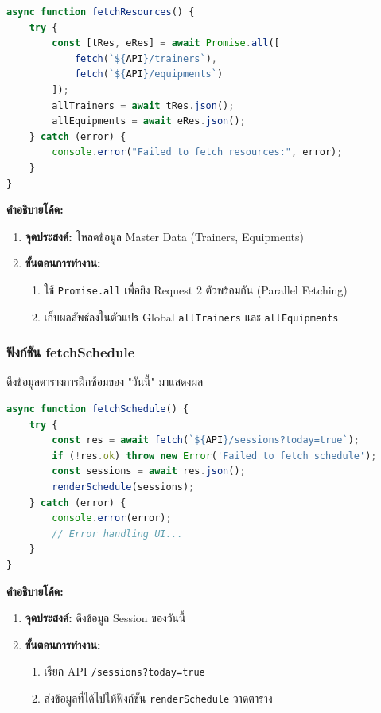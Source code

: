 \begin{lstlisting}[language=JavaScript, caption={ซอร์สโค้ดจากไฟล์ frontend/js/user/dashboard.js: ฟังก์ชัน fetchResources}, label={code:user-dash-fetch-resources}]
async function fetchResources() {
    try {
        const [tRes, eRes] = await Promise.all([
            fetch(`${API}/trainers`),
            fetch(`${API}/equipments`)
        ]);
        allTrainers = await tRes.json();
        allEquipments = await eRes.json();
    } catch (error) {
        console.error("Failed to fetch resources:", error);
    }
}
\end{lstlisting}

\textbf{คำอธิบายโค้ด:}
\begin{enumerate}
    \item \textbf{จุดประสงค์:} โหลดข้อมูล Master Data (Trainers, Equipments)
    \item \textbf{ขั้นตอนการทำงาน:}
    \begin{enumerate}
        \item ใช้ \texttt{Promise.all} เพื่อยิง Request 2 ตัวพร้อมกัน (Parallel Fetching)
        \item เก็บผลลัพธ์ลงในตัวแปร Global \texttt{allTrainers} และ \texttt{allEquipments}
    \end{enumerate}
\end{enumerate}

\subsubsection{ฟังก์ชัน fetchSchedule}
ดึงข้อมูลตารางการฝึกซ้อมของ "วันนี้" มาแสดงผล

\begin{lstlisting}[language=JavaScript, caption={ซอร์สโค้ดจากไฟล์ frontend/js/user/dashboard.js: ฟังก์ชัน fetchSchedule}, label={code:user-dash-fetch-schedule}]
async function fetchSchedule() {
    try {
        const res = await fetch(`${API}/sessions?today=true`); 
        if (!res.ok) throw new Error('Failed to fetch schedule');
        const sessions = await res.json();
        renderSchedule(sessions);
    } catch (error) {
        console.error(error);
        // Error handling UI...
    }
}
\end{lstlisting}

\textbf{คำอธิบายโค้ด:}
\begin{enumerate}
    \item \textbf{จุดประสงค์:} ดึงข้อมูล Session ของวันนี้
    \item \textbf{ขั้นตอนการทำงาน:}
    \begin{enumerate}
        \item เรียก API \texttt{/sessions?today=true}
        \item ส่งข้อมูลที่ได้ไปให้ฟังก์ชัน \texttt{renderSchedule} วาดตาราง
    \end{enumerate}
\end{enumerate}

